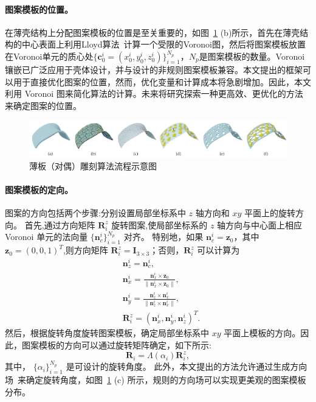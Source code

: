 \paragraph{图案模板的位置。}
在薄壳结构上分配图案模板的位置是至关重要的，如图~\ref{fig-shellCarved} (b)所示，首先在薄壳结构的中心表面上利用Lloyd算法~\cite{levy2010p}计算一个受限的Voronoi图，然后将图案模板放置在Voronoi单元的质心处$\{\mathbf{c}_0^i=(x_0^i, y_0^i, z_0^i)\}_{i=1}^{N_p}$，$N_p$是图案模板的数量。Voronoi 镶嵌已广泛应用于壳体设计，并与设计的非规则图案模板兼容。本文提出的框架可以用于直接优化图案的位置，然而，优化变量和计算成本将急剧增加。因此，本文利用 Voronoi 图来简化算法的计算。未来将研究探索一种更高效、更优化的方法来确定图案的位置。
\begin{figure}[htbp]
    \centering
    \includegraphics[width=1.0\linewidth]{./figures/algorithm-pipeline}
    \caption{薄板（对偶）雕刻算法流程示意图}
    \label{fig-shellCarved}
\end{figure}

\paragraph{图案模板的定向。}
图案的方向包括两个步骤:分别设置局部坐标系中 $z$ 轴方向和 $xy$ 平面上的旋转方向。
首先,通过方向矩阵 $\mathbf{R}_i^z$ 旋转图案,使局部坐标系的 $z$ 轴方向与中心面上相应 Voronoi 单元的法向量 $\{\mathbf{n}_c^i\}_{i=1}^{N_p}$ 对齐。
特别地，如果 $\mathbf{n}_c^i=\mathbf{z}_0$，其中 $\mathbf{z}_0=(0,0,1)^T$,则方向矩阵 $\mathbf{R}_i^z=\mathbf{I}_{3\times 3}$；否则，$\mathbf{R}_i^z$ 可以计算为
\begin{equation}
	\begin{split}
		& \mathbf{n}_z^i=\mathbf{n}_c^i,\\
		& \mathbf{n}_x^i=\frac{\mathbf{n}_x^i\times\mathbf{z}_0}{\|\mathbf{n}_x^i\times\mathbf{z}_0\|},\\ 
		&\mathbf{n}_y^i=\frac{\mathbf{n}_z^i\times\mathbf{n}_x^i}{\|\mathbf{n}_z^i\times\mathbf{n}_x^i\|},\\
		& \mathbf{R}^z_i=(\mathbf{n}_x^i, \mathbf{n}_y^i, \mathbf{n}_z^i)^T.
	\end{split}
\end{equation}
然后，根据旋转角度旋转图案模板，确定局部坐标系中 $xy$ 平面上模板的方向。因此，图案模板的方向可以通过旋转矩阵确定，如下所示:
\begin{equation}
    \mathbf{R}_i=\Lambda(\alpha_i)\mathbf{R}_i^z,
\end{equation}
其中， $\{\alpha_i\}_{i=1}^{N_p}$ 是可设计的旋转角度。
此外，本文提出的方法允许通过生成方向场~\cite{Directional}来确定旋转角度，如图~\ref{fig-shellCarved} (c) 所示，规则的方向场可以实现更美观的图案模板分布。


